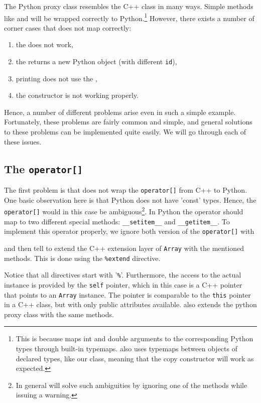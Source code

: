The Python proxy class resembles the C++ class in many ways. Simple methods like  and  will be wrapped correctly to Python.\footnote{This is because \swig maps int and double arguments to the corresponding Python types through built-in typemaps. \swig also uses typemaps between objects of declared types, like our  class, meaning that the copy constructor will work as expected.} However, there exists a number of corner cases that \swig does not map correctly:
\begin{enumerate}
\item the  does not work,
\item the  returns a new Python object (with different \texttt{id}),
\item printing does not use the ,%
\item the  constructor is not working properly.%
\end{enumerate}
Hence, a number of different problems arise even in such a simple example. Fortunately, these problems are fairly common and simple, and general solutions to these problems can be implemented quite easily. We will go through each of these issues.\par

\subsection{The \texttt{operator[]}}
The first problem is that \swig does not wrap the \texttt{operator[]} from C++ to Python. 
One basic observation here is that Python does not have 'const' types. Hence, 
the \texttt{operator[]} would in this case be ambiguous\footnote{In general will \swig solve such ambiguities by ignoring one of the methods while issuing a warning.}. 
In Python the operator should map to two different special methods: \texttt{\_\_setitem\_\_} and \texttt{\_\_getitem\_\_}. To implement this operator properly, we ignore both version of the \texttt{operator[]} with
\begin{code}
\end{code}
and then tell \swig to extend the C++ extension layer of \texttt{Array} with the mentioned methods. This is done using the \texttt{\%extend} directive.
Notice that all \swig directives start with '\texttt{\%}'. 
Furthermore, the access to the actual instance is provided by the \texttt{self} pointer, which in this case is a C++ pointer that points to an \texttt{Array} instance. The pointer is comparable to the \texttt{this} pointer in a C++ class, but with only public attributes available. \swig also extends the python proxy class with the same methods.\par

